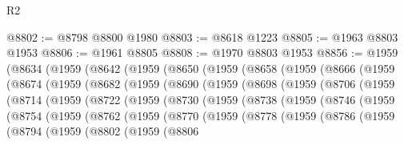 \begin{lexlean}{R2}
\begin{coremodule}
@8802 := @8798 @8800 @1980
@8803 := @8618 @1223
@8805 := @1963 @8803 @1953
@8806 := @1961 @8805
@8808 := @1970 @8803 @1953
@8856 := @1959
    (@8634
      (@1959
        (@8642
          (@1959
            (@8650
              (@1959
                (@8658
                  (@1959
                    (@8666
                      (@1959
                        (@8674
                          (@1959
                            (@8682
                              (@1959
                                (@8690
                                  (@1959
                                    (@8698
                                      (@1959
                                        (@8706
                                          (@1959
                                            (@8714
                                              (@1959
                                                (@8722
                                                  (@1959
                                                    (@8730
                                                      (@1959
                                                        (@8738
                                                          (@1959
                                                            (@8746
                                                              (@1959
                                                                (@8754
                                                                  (@1959
                                                                    (@8762
                                                                      (@1959
                                                                        (@8770
                                                                          (@1959
                                                                            (@8778
                                                                              (@1959
                                                                                (@8786
                                                                                  (@1959
                                                                                    (@8794
                                                                                      (@1959
                                                                                        (@8802
                                                                                          (@1959
                                                                                            (@8806

\end{coremodule}
\end{lexlean}
